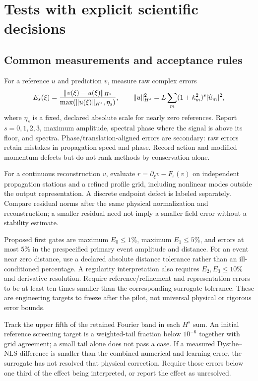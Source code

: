 \section{Tests with explicit scientific decisions}
\label{sec:tests}

\subsection{Common measurements and acceptance rules}
For a reference $u$ and prediction $v$, measure raw complex errors
\[
E_s(\xi)=\frac{\lVert v(\xi)-u(\xi)\rVert_{H^s}}
                   {\max(\lVert u(\xi)\rVert_{H^s},\eta_s)},\qquad
\lVert u\rVert_{H^s}^2=L\sum_m(1+k_m^2)^s|\widehat u_m|^2,
\]
where $\eta_s$ is a fixed, declared absolute scale for nearly zero
references. Report $s=0,1,2,3$, maximum amplitude, spectral phase where
the signal is above its floor, and spectra. Phase/translation-aligned
errors are secondary: raw errors retain mistakes in propagation speed
and phase. Record action and modified momentum defects but do not
rank methods by conservation alone.

For a continuous reconstruction $v$, evaluate
$r=\partial_\xi v-F_\epsilon(v)$ on independent propagation stations
and a refined profile grid, including nonlinear modes outside the
output representation. A discrete endpoint defect is labeled separately.
Compare residual norms after the same physical normalization and
reconstruction; a smaller residual need not imply a smaller field error
without a stability estimate.

Proposed first gates are maximum $E_0\leq1\%$, maximum $E_1\leq5\%$,
and errors at most $5\%$ in the prespecified primary event amplitude and
distance. For an event near zero distance, use a declared absolute
distance tolerance rather than an ill-conditioned percentage.
A regularity interpretation also requires $E_2,E_3\leq10\%$ and
derivative resolution. Require reference/refinement and representation
errors to be at least ten times smaller than the corresponding
surrogate tolerance. These are engineering targets to freeze after
the pilot, not universal physical or rigorous error bounds.

Track the upper fifth of the retained Fourier band in each $H^s$ sum.
An initial reference screening target is a weighted-tail fraction below
$10^{-6}$ together with grid agreement; a small tail alone does not pass
a case. If a measured Dysthe--NLS difference is smaller than the
combined numerical and learning error, the surrogate has not resolved
that physical correction. Require those errors below one third of the
effect being interpreted, or report the effect as unresolved.

